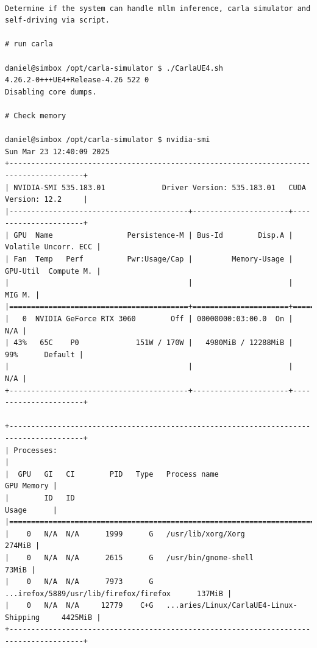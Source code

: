 \begin{verbatim}

Determine if the system can handle mllm inference, carla simulator and self-driving via script.

# run carla

daniel@simbox /opt/carla-simulator $ ./CarlaUE4.sh 
4.26.2-0+++UE4+Release-4.26 522 0
Disabling core dumps.

# Check memory

daniel@simbox /opt/carla-simulator $ nvidia-smi
Sun Mar 23 12:40:09 2025       
+---------------------------------------------------------------------------------------+
| NVIDIA-SMI 535.183.01             Driver Version: 535.183.01   CUDA Version: 12.2     |
|-----------------------------------------+----------------------+----------------------+
| GPU  Name                 Persistence-M | Bus-Id        Disp.A | Volatile Uncorr. ECC |
| Fan  Temp   Perf          Pwr:Usage/Cap |         Memory-Usage | GPU-Util  Compute M. |
|                                         |                      |               MIG M. |
|=========================================+======================+======================|
|   0  NVIDIA GeForce RTX 3060        Off | 00000000:03:00.0  On |                  N/A |
| 43%   65C    P0             151W / 170W |   4980MiB / 12288MiB |     99%      Default |
|                                         |                      |                  N/A |
+-----------------------------------------+----------------------+----------------------+
                                                                                         
+---------------------------------------------------------------------------------------+
| Processes:                                                                            |
|  GPU   GI   CI        PID   Type   Process name                            GPU Memory |
|        ID   ID                                                             Usage      |
|=======================================================================================|
|    0   N/A  N/A      1999      G   /usr/lib/xorg/Xorg                          274MiB |
|    0   N/A  N/A      2615      G   /usr/bin/gnome-shell                         73MiB |
|    0   N/A  N/A      7973      G   ...irefox/5889/usr/lib/firefox/firefox      137MiB |
|    0   N/A  N/A     12779    C+G   ...aries/Linux/CarlaUE4-Linux-Shipping     4425MiB |
+---------------------------------------------------------------------------------------+



\end{verbatim}
